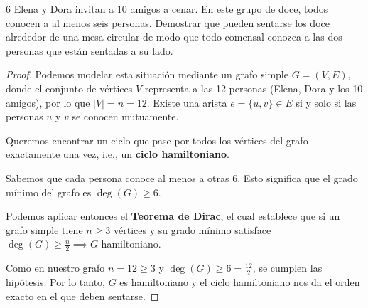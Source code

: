 \begin{ejercicio}{6}
    Elena y Dora invitan a 10 amigos a cenar. En este grupo de doce, todos conocen a al menos seis personas. Demostrar que pueden sentarse los doce alrededor de una mesa circular de modo que todo comensal conozca a las dos personas que están sentadas a su lado.
\end{ejercicio}
\begin{proof}
    Podemos modelar esta situación mediante un grafo simple \(G = (V,E)\), donde el conjunto de vértices \(V\) representa a las 12 personas (Elena, Dora y los 10 amigos), por lo que \(|V| = n = 12\). Existe una arista \(e = \{u,v\} \in E\) si y solo si las personas \(u\) y \(v\) se conocen mutuamente.

    Queremos encontrar un ciclo que pase por todos los vértices del grafo exactamente una vez, i.e., un \textbf{ciclo hamiltoniano}.

    Sabemos que cada persona conoce al menos a otras 6. Esto significa que el grado mínimo del grafo es \(\deg(G) \geq 6\).

    Podemos aplicar entonces el \textbf{Teorema de Dirac}, el cual establece que si un grafo simple tiene \(n \ge 3\) vértices y su grado mínimo satisface \(\deg(G) \ge \frac{n}{2} \implies G \) hamiltoniano.

    Como en nuestro grafo \(n = 12 \ge 3\) y \(\deg(G) \ge 6 = \frac{12}{2}\), se cumplen las hipótesis. Por lo tanto, \(G\) es hamiltoniano y el ciclo hamiltoniano nos da el orden exacto en el que deben sentarse.
\end{proof}

\vspace{0.5cm}

